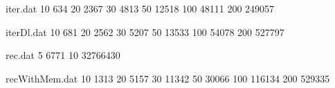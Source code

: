 \usepackage{pgfplots}
\usepackage{filecontents}
\usetikzlibrary{datavisualization}
\usetikzlibrary{datavisualization.formats.functions}
\begin{filecontents}{iter.dat}
10      634
20      2367
30      4813
50      12518
100     48111
200     249057
\end{filecontents}

\begin{filecontents}{iterDl.dat}
10      681
20      2562
30      5207
50      13533
100     54078
200     527797
\end{filecontents}

\begin{filecontents}{rec.dat}
5       6771
10      32766430
\end{filecontents}

\begin{filecontents}{recWithMem.dat}
10      1313
20      5157
30      11342
50      30066
100     116134
200     529335
\end{filecontents}

